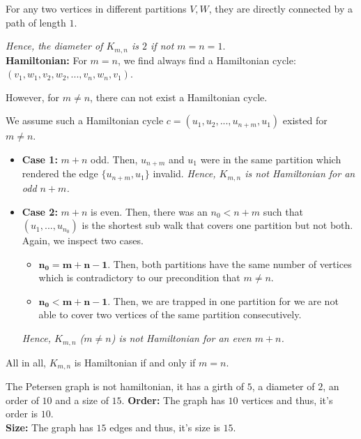\documentclass[a4paper]{article}
\begin{document}
\begin{solution}{9}
\begin{theorem}
				For any two vertices in different partitions $V, W$, they are directly connected by a path of length $1$.

				 \emph{Hence, the diameter of $K_{m,n}$ is $2$ if not $m = n = 1$}.\\

			\textbf{Hamiltonian:} For $m = n$, we find always find a Hamiltonian cycle: $(v_1, w_1, v_2, w_2, ..., v_n, w_n, v_1)$.

				However, for $m \neq n$, there can not exist a Hamiltonian cycle.

				We assume such a Hamiltonian cycle $c = (u_1, u_2, ..., u_{n+m}, u_1)$ existed for $m \neq n$. 
				\begin{itemize}
					\item \textbf{Case 1:} $m + n$ odd. Then, $u_{n+m}$ and $u_1$ were in the same partition which rendered the edge $\{u_{n+m}, u_1\}$ invalid. \emph{Hence, $K_{m,n}$ is not Hamiltonian for an odd $n + m$.}
					\item \textbf{Case 2:} $m + n$ is even. Then, there was an $n_0 < n+m$ such that $(u_1, ..., u_{n_0})$ is the shortest sub walk that covers one partition but not both. Again, we inspect two cases.
						\begin{itemize}
							\item $\mathbf{n_0 = m + n - 1}$. Then, both partitions have the same number of vertices which is contradictory to our precondition that $m \neq n$.
							\item $\mathbf{n_0 < m + n - 1}$. Then, we are trapped in one partition for we are not able to cover two vertices of the same partition consecutively.
						\end{itemize}
					\emph{Hence, $K_{m, n}$ ($m \neq n$) is not Hamiltonian for an even $m + n$.}
				\end{itemize}

				All in all, $K_{m,n}$ is Hamiltonian if and only if $m = n$.
		\end{theorem}
			
		\newpage

		\begin{theorem}{The Petersen graph is not hamiltonian, it has a girth of $5$, a diameter of $2$, an order of $10$ and a size of $15$.}
			\textbf{Order:} The graph has $10$ vertices and thus, it's order is $10$.\\
			
			\textbf{Size:} The graph has $15$ edges and thus, it's size is $15$.\\


\end{theorem}
\end{solution}
\end{document}
